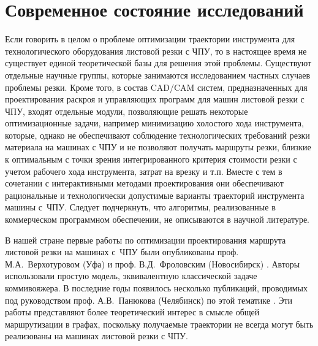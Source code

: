 
\section{Современное состояние исследований}
\label{sec:cut.refs}

Если говорить в целом о проблеме оптимизации траектории инструмента для технологического оборудования листовой
резки с ЧПУ,
то в настоящее время не существует единой теоретической базы для решения этой проблемы.
Существуют отдельные научные группы,
которые занимаются исследованием частных случаев проблемы резки.
Кроме того,
в состав CAD/CAM систем,
предназначенных для проектирования раскроя и управляющих программ для машин листовой резки с ЧПУ,
входят отдельные модули,
позволяющие решать некоторые оптимизационные задачи,
например минимизацию холостого хода инструмента,
которые, однако не обеспечивают соблюдение
технологических требований резки материала на машинах с ЧПУ
и не позволяют получать маршруты резки,
близкие к оптимальным с точки зрения интегрированного критерия стоимости резки
с учетом рабочего хода инструмента, затрат на врезку и т.п.
Вместе с тем в сочетании с интерактивными методами проектирования
они обеспечивают рациональные и технологически допустимые варианты траекторий инструмента машины с~ЧПУ.
Следует подчеркнуть, что алгоритмы,
реализованные в коммерческом программном обеспечении,
не описываются в научной литературе.

В нашей стране первые работы по оптимизации проектирования маршрута листовой резки на машинах с~ЧПУ
были опубликованы проф. М.А.~Верхотуровом
(Уфа)
\cite{bi:верхотуров2008,bi:верхотуров2008цепь}
и проф. В.Д.~Фроловским
(Новосибирск)
\cite{bi:Ganelina,bi:пушкарева,bi:фроловский2005}.
Авторы использовали
простую модель, эквивалентную классической задаче коммивояжера.
В последние годы появилось несколько публикаций,
проводимых под руководством проф. А.В.~Панюкова
(Челябинск) по
этой тематике
\cite{bi:Makarovskikh2019Jan,Makarovskikh20181171,bi:Makarovskikh2019Other}.
Эти работы представляют более теоретический интерес
в смысле общей маршрутизации в графах,
поскольку получаемые траектории не всегда могут быть реализованы на машинах листовой резки с ЧПУ.

